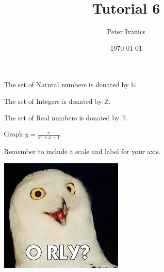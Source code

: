 \documentclass[11]{article}
\def\eq1{y=\frac{x}{x^3 + x + 1}} %
\def\labelaxis{Remember to include a scale and label for your axis.} %
\begin{document}
	\title{Tutorial 6}
	\author{Peter Ivanics}
	\date{\today}
	\maketitle
	
	The set of Natural numbers is donated by $\mathbb{N}$.
	
	The set of Integers is donated by $\mathbb{Z}$.
	
	The set of Real numbers is donated by $\mathbb{R}$.
	
	Graph $ \eq1 $.
	
	\labelaxis
	
	\includegraphics{orly.jpg}
\end{document}
